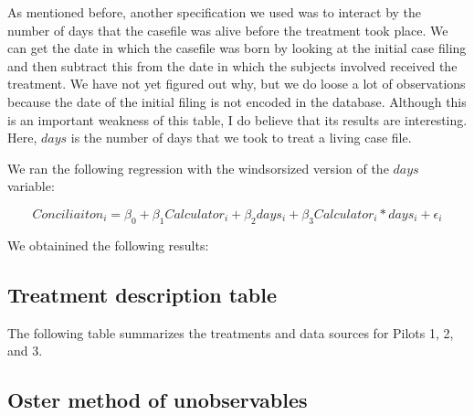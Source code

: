 As mentioned before, another specification we used was to interact by the number of days that the casefile was alive before the treatment took place. We can get the date in which the casefile was born by looking at the initial case filing and then subtract this from the date in which the subjects involved received the treatment. We have not yet figured out why, but we do loose a lot of observations because the date of the initial filing is not encoded in the database. Although this is an important weakness of this table, I do believe that its results are interesting. Here, $days$ is the number of days that we took to treat a living case file.  

We ran the following regression with the windsorsized version of the $days$ variable: 

\begin{equation}
Conciliaiton_i = \beta_0 + \beta_1 Calculator_i + \beta_2 days_i + \beta_3 Calculator_i * days_i + \epsilon_i
\end{equation}

We obtainined the following results: 

\FloatBarrier



\FloatBarrier

\subsection{Treatment description table}

The following table summarizes the treatments and data sources for Pilots 1, 2, and 3. 

\begin{landscape}
\begin{centering}
\begin{table}[!ht]
    \caption{Pilots 1, 2, and 3 descriptions}
    \label{exp_updating}
    \scriptsize{}
\end{table}
\end{centering}
\end{landscape}

\subsection{Oster method of unobservables}

\begin{centering}
\begin{table}[!ht]
    \caption{Unobservables}
    \label{exp_updating}
    \scriptsize{}
\end{table}
\end{centering}

